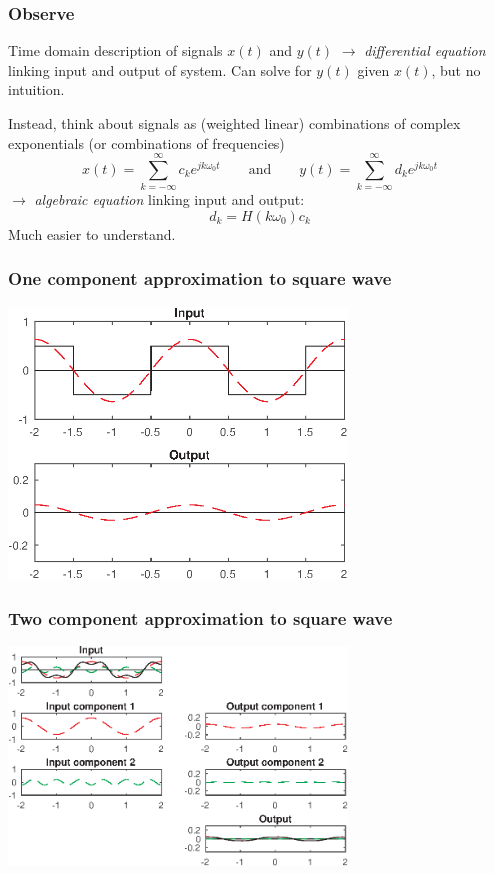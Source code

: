 \documentclass[10pt]{beamer}
\begin{document}
\begin{frame}
  \frametitle{Observe}
  Time domain description of signals $x(t)$ and $y(t)$ $\longrightarrow$
  {\it differential equation} linking input and output of system.  Can solve
  for $y(t)$ given $x(t)$, but no intuition.

  Instead, think about signals as (weighted linear) combinations of complex
  exponentials (or combinations of frequencies)
  \begin{equation*}
    x(t) = \sum_{k=-\infty}^{\infty} c_k e^{j k \omega_0 t}
    \qquad \text{and} \qquad
    y(t) = \sum_{k=-\infty}^{\infty} d_k e^{j k \omega_0 t}
  \end{equation*}
  $\longrightarrow$ {\it algebraic equation} linking input and
  output:
  \begin{equation*}
    d_k = H(k \omega_0) c_k
  \end{equation*}
  Much easier to understand.
\end{frame}

\begin{frame}
  \frametitle{One component approximation to square wave}
  \begin{center}
    \includegraphics[width=9cm]{fs_rclpf_fig01}
  \end{center}
\end{frame}

\begin{frame}
  \frametitle{Two component approximation to square wave}
  \begin{center}
    \includegraphics[width=9cm]{fs_rclpf_fig02}
  \end{center}
\end{frame}
\end{document}
